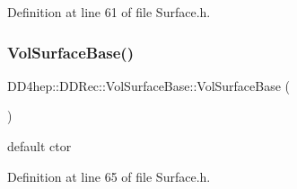 Definition at line 61 of file Surface.\+h.

\hypertarget{class_d_d4hep_1_1_d_d_rec_1_1_vol_surface_base_a837e93db1de913c7a7fccee261a59dd7}{}\label{class_d_d4hep_1_1_d_d_rec_1_1_vol_surface_base_a837e93db1de913c7a7fccee261a59dd7} 
\subsubsection{\texorpdfstring{Vol\+Surface\+Base()}{VolSurfaceBase()}\hspace{0.1cm}{\footnotesize\ttfamily [1/3]}}
{\footnotesize\ttfamily D\+D4hep\+::\+D\+D\+Rec\+::\+Vol\+Surface\+Base\+::\+Vol\+Surface\+Base (\begin{DoxyParamCaption}{ }\end{DoxyParamCaption})\hspace{0.3cm}{\ttfamily [inline]}}



default c\textquotesingle{}tor 



Definition at line 65 of file Surface.\+h.

\hypertarget{class_d_d4hep_1_1_d_d_rec_1_1_vol_surface_base_a2237eee6e8b307480cfd1d1ff91b534a}{}\label{class_d_d4hep_1_1_d_d_rec_1_1_vol_surface_base_a2237eee6e8b307480cfd1d1ff91b534a} 
